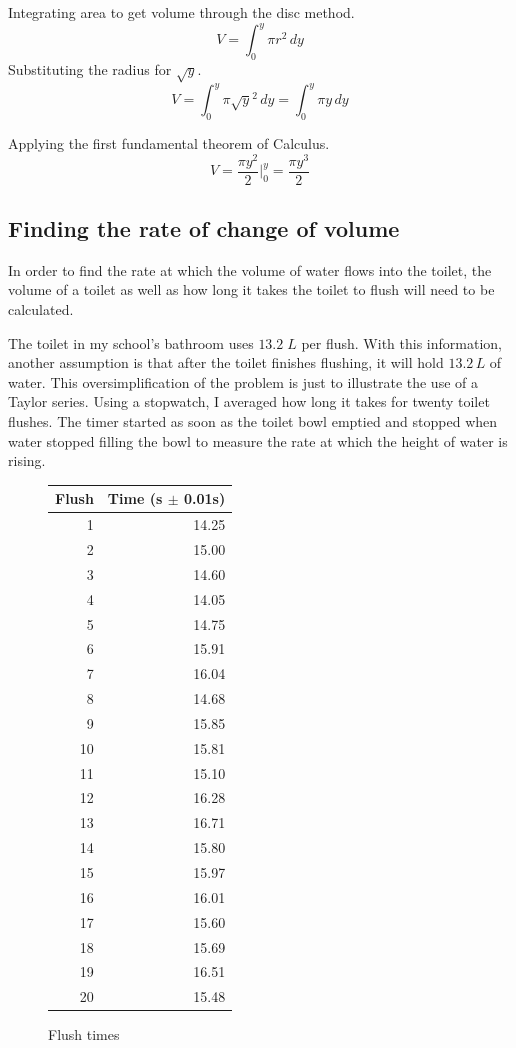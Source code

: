 \documentclass[12pt, titlepage]{article}
\begin{document}
Integrating area to get volume through the disc method.
\begin{equation*}
    V = \int^y_0 \pi r^2\,dy
\end{equation*}
Substituting the radius for \(\sqrt{y}\).
\begin{equation*}
    V = \int^y_0 \pi \sqrt{y}^2\,dy  = \int^y_0 \pi y\,dy 
\end{equation*}

Applying the first fundamental theorem of Calculus.
\begin{equation*}
    V = \frac{ \pi y^2 }{2} \biggr \rvert^y_0 = \frac{\pi y^3}{2}
\end{equation*}

\subsection{Finding the rate of change of volume}
In order to find the rate at which the volume of water flows into the toilet, the volume of a toilet as well as how long it takes the toilet to flush will need to be calculated. 

\pagebreak
The toilet in my school's bathroom uses \(13.2 \; L\) per flush. With this information, another assumption is that after the toilet finishes flushing, it will hold \(13.2 \, L\) of water. This oversimplification of the problem is just to illustrate the use of a Taylor series. Using a stopwatch, I averaged how long it takes for twenty toilet flushes. The timer started as soon as the toilet bowl emptied and stopped when water stopped filling the bowl to measure the rate at which the height of water is rising.

\begin{figure}[H]
\begin{center}
\begin{tabular}{rr}
Flush & Time (s \(\pm\) 0.01s)\\
\hline
1 & 14.25\\
2 & 15.00\\
3 & 14.60\\
4 & 14.05\\
5 & 14.75\\
6 & 15.91\\
7 & 16.04\\
8 & 14.68\\
9 & 15.85\\
10 & 15.81\\
11 & 15.10\\
12 & 16.28\\
13 & 16.71\\
14 & 15.80\\
15 & 15.97\\
16 & 16.01\\
17 & 15.60\\
18 & 15.69\\
19 & 16.51\\
20 & 15.48\\
\end{tabular}
	\caption{Flush times}
\end{center}
\end{figure}
\end{document}
